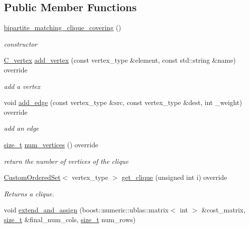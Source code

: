 \subsection*{Public Member Functions}
\begin{DoxyCompactItemize}
\item 
\hyperlink{classbipartite__matching__clique__covering_aa1a0ba14161d2bdcf6ab53169c3fffb5}{bipartite\+\_\+matching\+\_\+clique\+\_\+covering} ()
\begin{DoxyCompactList}\small\item\em constructor \end{DoxyCompactList}\item 
\hyperlink{clique__covering__graph_8hpp_a9cb45047ea8c5ed95a8cfa90494345aa}{C\+\_\+vertex} \hyperlink{classbipartite__matching__clique__covering_a78ab8166598fa7d3d6cfb9162ee07bd0}{add\+\_\+vertex} (const vertex\+\_\+type \&element, const std\+::string \&name) override
\begin{DoxyCompactList}\small\item\em add a vertex \end{DoxyCompactList}\item 
void \hyperlink{classbipartite__matching__clique__covering_abe8fd66049b25b749b5fa2e8254742cc}{add\+\_\+edge} (const vertex\+\_\+type \&src, const vertex\+\_\+type \&dest, int \+\_\+weight) override
\begin{DoxyCompactList}\small\item\em add an edge \end{DoxyCompactList}\item 
\hyperlink{tutorial__fpt__2017_2intro_2sixth_2test_8c_a7c94ea6f8948649f8d181ae55911eeaf}{size\+\_\+t} \hyperlink{classbipartite__matching__clique__covering_a023f2eea658d97a22e5dbddc89fb1da5}{num\+\_\+vertices} () override
\begin{DoxyCompactList}\small\item\em return the number of vertices of the clique \end{DoxyCompactList}\item 
\hyperlink{classCustomOrderedSet}{Custom\+Ordered\+Set}$<$ vertex\+\_\+type $>$ \hyperlink{classbipartite__matching__clique__covering_ad44a38f1e0c81a9e5b534c729eaf7ea7}{get\+\_\+clique} (unsigned int i) override
\begin{DoxyCompactList}\small\item\em Returns a clique. \end{DoxyCompactList}\item 
void \hyperlink{classbipartite__matching__clique__covering_ac0e15a14d2f5e861835c2bc74dfeff79}{extend\+\_\+and\+\_\+assign} (boost\+::numeric\+::ublas\+::matrix$<$ int $>$ \&cost\+\_\+matrix, \hyperlink{tutorial__fpt__2017_2intro_2sixth_2test_8c_a7c94ea6f8948649f8d181ae55911eeaf}{size\+\_\+t} \&final\+\_\+num\+\_\+cols, \hyperlink{tutorial__fpt__2017_2intro_2sixth_2test_8c_a7c94ea6f8948649f8d181ae55911eeaf}{size\+\_\+t} num\+\_\+rows)

\end{DoxyCompactItemize}
